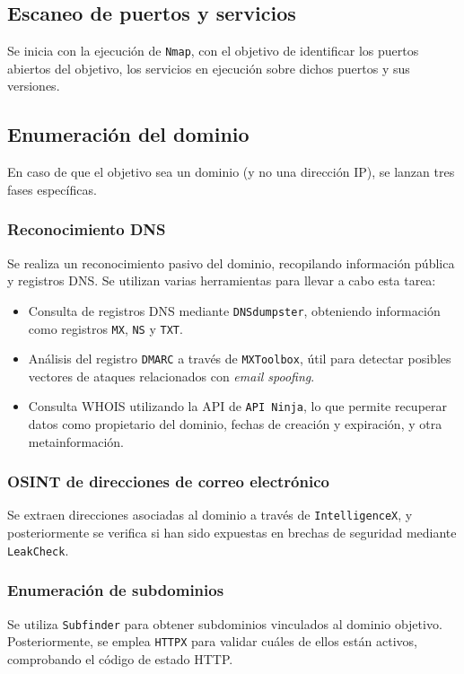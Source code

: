 \begin{parskipenv}
\subsection{Escaneo de puertos y servicios}
Se inicia con la ejecución de \texttt{Nmap}, con el objetivo de identificar los puertos abiertos del objetivo, los servicios en ejecución sobre dichos puertos y sus versiones.

\subsection{Enumeración del dominio}
En caso de que el objetivo sea un dominio (y no una dirección IP), se lanzan tres fases específicas.

\subsubsection*{Reconocimiento DNS}
Se realiza un reconocimiento pasivo del dominio, recopilando información pública y registros DNS. Se utilizan varias herramientas para llevar a cabo esta tarea:

\begin{itemize}
  \item Consulta de registros DNS mediante \texttt{DNSdumpster}, obteniendo información como registros \texttt{MX}, \texttt{NS} y \texttt{TXT}.
  \item Análisis del registro \texttt{DMARC} a través de \texttt{MXToolbox}, útil para detectar posibles vectores de ataques relacionados con \textit{email spoofing}.
  \item Consulta WHOIS utilizando la API de \texttt{API Ninja}, lo que permite recuperar datos como propietario del dominio, fechas de creación y expiración, y otra metainformación.
\end{itemize}

\subsubsection*{OSINT de direcciones de correo electrónico}
Se extraen direcciones asociadas al dominio a través de \texttt{IntelligenceX}, y posteriormente se verifica si han sido expuestas en brechas de seguridad mediante \texttt{LeakCheck}.

\subsubsection*{Enumeración de subdominios}
Se utiliza \texttt{Subfinder} para obtener subdominios vinculados al dominio objetivo. Posteriormente, se emplea \texttt{HTTPX} para validar cuáles de ellos están activos, comprobando el código de estado HTTP.


\end{parskipenv}
